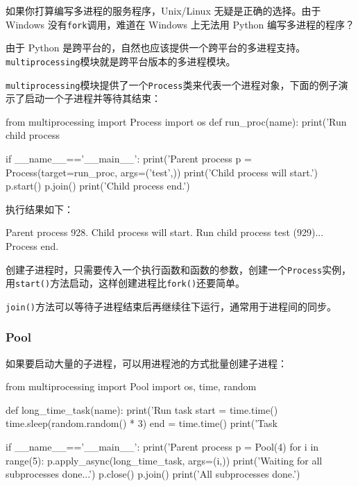 如果你打算编写多进程的服务程序，Unix/Linux 无疑是正确的选择。由于
Windows 没有\texttt{fork}调用，难道在 Windows 上无法用 Python
编写多进程的程序？

由于 Python
是跨平台的，自然也应该提供一个跨平台的多进程支持。\texttt{multiprocessing}模块就是跨平台版本的多进程模块。

\texttt{multiprocessing}模块提供了一个\texttt{Process}类来代表一个进程对象，下面的例子演示了启动一个子进程并等待其结束：

\begin{pythoncode}
from multiprocessing import Process
import os
def run_proc(name):
    print('Run child process %

if __name__=='__main__':
    print('Parent process %
    p = Process(target=run_proc, args=('test',))
    print('Child process will start.')
    p.start()
    p.join()
    print('Child process end.')
\end{pythoncode}

执行结果如下：

\begin{pythoncode}
Parent process 928.
Child process will start.
Run child process test (929)...
Process end.
\end{pythoncode}

创建子进程时，只需要传入一个执行函数和函数的参数，创建一个\texttt{Process}实例，用\texttt{start()}方法启动，这样创建进程比\texttt{fork()}还要简单。

\texttt{join()}方法可以等待子进程结束后再继续往下运行，通常用于进程间的同步。

\hypertarget{pool}{%
\subsubsection{Pool}\label{pool}}

如果要启动大量的子进程，可以用进程池的方式批量创建子进程：

\begin{pythoncode}
from multiprocessing import Pool
import os, time, random

def long_time_task(name):
    print('Run task %
    start = time.time()
    time.sleep(random.random() * 3)
    end = time.time()
    print('Task %

if __name__=='__main__':
    print('Parent process %
    p = Pool(4)
    for i in range(5):
        p.apply_async(long_time_task, args=(i,))
    print('Waiting for all subprocesses done...')
    p.close()
    p.join()
    print('All subprocesses done.')
\end{pythoncode}


